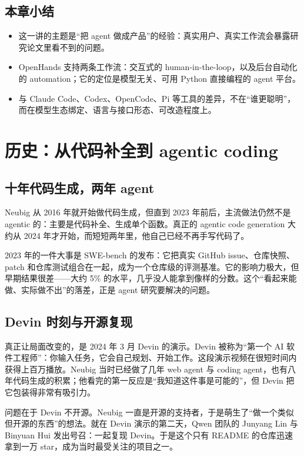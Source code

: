 \documentclass[a4paper]{article}
\begin{document}
\subsection{本章小结}

\begin{itemize}
\item 这一讲的主题是“把 agent 做成产品”的经验：真实用户、真实工作流会暴露研究论文里看不到的问题。
\item OpenHands 支持两条工作流：交互式的 human-in-the-loop，以及后台自动化的 automation；它的定位是模型无关、可用 Python 直接编程的 agent 平台。
\item 与 Claude Code、Codex、OpenCode、Pi 等工具的差异，不在“谁更聪明”，而在模型生态绑定、语言与接口形态、可改造程度上。
\end{itemize}

\section{历史：从代码补全到 agentic coding}

\subsection{十年代码生成，两年 agent}

Neubig 从 2016 年就开始做代码生成，但直到 2023 年前后，主流做法仍然不是 agentic 的：主要是代码补全、生成单个函数。真正的 agentic code generation 大约从 2024 年才开始，而短短两年里，他自己已经不再手写代码了。

2023 年的一件大事是 SWE-bench 的发布：它把真实 GitHub issue、仓库快照、patch 和仓库测试组合在一起，成为一个仓库级的评测基准。它的影响力极大，但早期结果很差——大约 5\% 的水平，几乎没人能拿到像样的分数。这个“看起来能做、实际做不出”的落差，正是 agent 研究要解决的问题。

\subsection{Devin 时刻与开源复现}

真正让局面改变的，是 2024 年 3 月 Devin 的演示。Devin 被称为“第一个 AI 软件工程师”：你输入任务，它会自己规划、开始工作。这段演示视频在很短时间内获得上百万播放。Neubig 当时已经做了几年 web agent 与 coding agent，也有八年代码生成的积累；他看完的第一反应是“我知道这件事是可能的”，但 Devin 把它包装得非常有吸引力。

问题在于 Devin 不开源。Neubig 一直是开源的支持者，于是萌生了“做一个类似但开源的东西”的想法。就在 Devin 演示的第二天，Qwen 团队的 Junyang Lin 与 Binyuan Hui 发出号召：一起复现 Devin。于是这个只有 README 的仓库迅速拿到一万 star，成为当时最受关注的项目之一。
\end{document}
